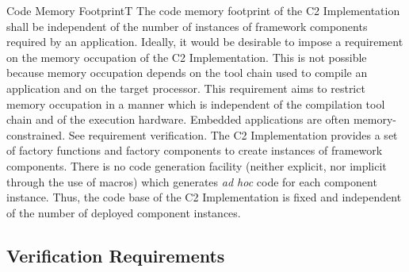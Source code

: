 \documentclass[a4paper,10pt]{article}
\newenvironment{fw_req_note}[7]
{\addtocounter{subsubsection}{1}
	\hspace{0.2cm}\textbf{FW-\arabic{section}.\arabic{subsection}.\arabic{subsubsection}/#2
	\hspace{0.8cm} #1}
	\vspace{-10pt}
\begin{longtable}{p{2.7cm}P{8.5cm}}
\hline
\textsc{Requirement} & #3 \\
\textsc{Note} & #4 \\
\textsc{Justification} & #5 \\
\textsc{Implementation} & #6  \\ 
\textsc{Verification} & #7  \\
\hline
}
{\end{longtable}}
\begin{document}
\begin{fw_req_note}{Code Memory Footprint}{T}
{The code memory footprint of the C2 Implementation shall be independent of the number of instances of framework components required by an application.}
{Ideally, it would be desirable to impose a requirement on the memory occupation 
of the C2 Implementation. This is not possible because memory occupation depends on the tool chain used to compile an application and on the target processor. This requirement aims to restrict memory occupation in a manner which is independent of the compilation tool chain and of the execution hardware.}
{Embedded applications are often memory-constrained.}
{See requirement verification.} 
{The C2 Implementation provides a set of factory functions and factory components to create instances of framework components. There is no code generation facility (neither explicit, nor implicit through the use of macros) which generates \emph{ad hoc} code for each component instance. Thus, the code base of the C2 Implementation is fixed and independent of the number of deployed component instances.}
\end{fw_req_note}


\subsection{Verification Requirements}\label{req:verificationReqs}
\end{document}
